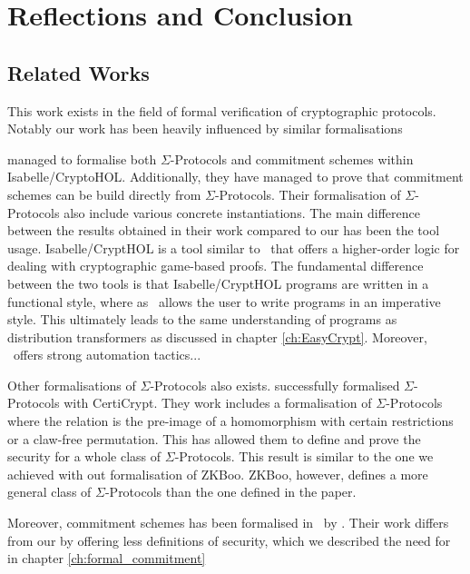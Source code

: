 \chapter{Reflections and Conclusion}
\label{sec:reflection_conclusion}

\section{Related Works}
\label{sec:related_works}
This work exists in the field of formal verification of cryptographic protocols.
Notably our work has been heavily influenced by similar formalisations
\cite{cryptoeprint:2019:1185,DBLP:journals/corr/MetereD17,certicrypt_sigma,zkcrypt,Yao}

\citet{cryptoeprint:2019:1185} managed to formalise both $\Sigma$-Protocols and
commitment schemes within Isabelle/CryptoHOL. Additionally, they have managed to
prove that commitment schemes can be build directly from $\Sigma$-Protocols.
Their formalisation of $\Sigma$-Protocols also include various concrete
instantiations.
The main difference between the results obtained in their work compared to our
has been the tool usage. Isabelle/CryptHOL is a tool similar to \easycrypt\ that
offers a higher-order logic for dealing with cryptographic game-based proofs.
The fundamental difference between the two tools is that Isabelle/CryptHOL
programs are written in a functional style, where as \easycrypt\ allows the user
to write programs in an imperative style. This ultimately leads to the same
understanding of programs as distribution transformers as discussed in chapter
\ref{ch:EasyCrypt}. Moreover, \easycrypt\ offers strong automation tactics...

Other formalisations of $\Sigma$-Protocols also exists. \citet{certicrypt_sigma}
successfully formalised $\Sigma$-Protocols with CertiCrypt. They work includes a
formalisation of $\Sigma$-Protocols where the relation is the pre-image of a
homomorphism with certain restrictions or a claw-free permutation. This has
allowed them to define and prove the security for a whole class of
$\Sigma$-Protocols. This result is similar to the one we achieved with out
formalisation of ZKBoo. ZKBoo, however, defines a more general class of
$\Sigma$-Protocols than the one defined in the paper.

Moreover, commitment schemes has been formalised in \easycrypt\ by
\citet{DBLP:journals/corr/MetereD17}. Their work differs from our by offering
less definitions of security, which we described the need for in chapter \ref{ch:formal_commitment}

